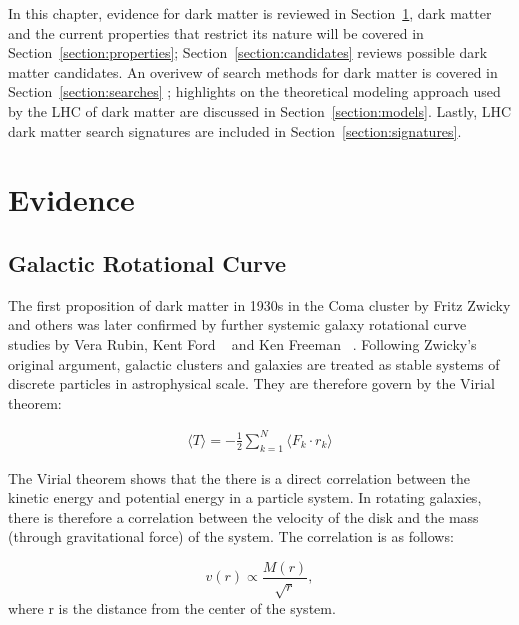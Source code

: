    In this chapter, evidence for dark matter is reviewed in Section~\ref{section:evidence}, dark matter and the current properties that restrict its nature will be covered in Section~\ref{section:properties}; Section~\ref{section:candidates} reviews possible dark matter candidates. An overivew of search methods for dark matter is covered in Section~\ref{section:searches} ; highlights on the theoretical modeling approach used by the LHC of dark matter are discussed in Section~\ref{section:models}. Lastly, LHC dark matter search signatures are included in Section~\ref{section:signatures}.

\section{Evidence}
\label{section:evidence}

\subsection{Galactic Rotational Curve}
    The first proposition of dark matter in 1930s in the Coma cluster by Fritz Zwicky and others was later confirmed by further systemic galaxy rotational curve studies by Vera Rubin, Kent Ford ~\cite{Rubin} and Ken Freeman ~\cite{freeman}.  
    Following Zwicky's original argument, galactic clusters and galaxies are treated as stable systems of discrete particles in astrophysical scale. They are therefore govern by the Virial theorem:
%

\begin{align}
\begin{equation}
     \langle T \rangle = -\frac{1}{2} \sum_{k=1}^{N} \langle F_{k} \cdot r_{k} \rangle
    \label{eq:virial}

\end{equation}
\end{align}


    The Virial theorem shows that the there is a direct correlation between the kinetic energy and potential energy in a particle system. In rotating galaxies, there is therefore a correlation between the velocity of the disk and the mass (through gravitational force) of the system. The correlation is as follows: 
    
     $$ v(r) \varpropto \frac{M(r)}{\sqrt{r}}, $$ where r is the distance from the center of the system.

